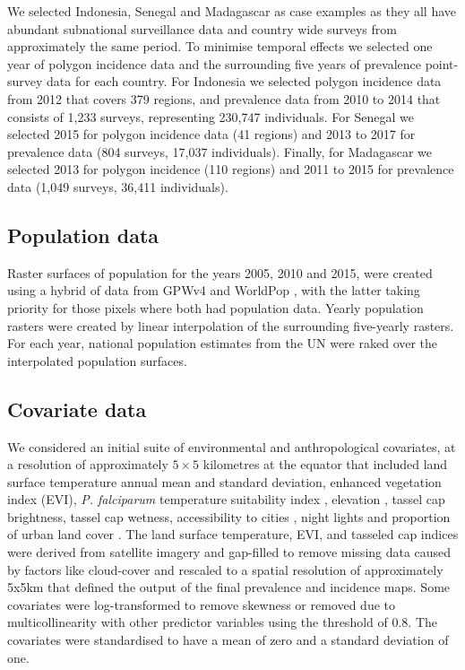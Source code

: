 \documentclass{statsoc}
\begin{document}
We selected Indonesia, Senegal and Madagascar as case examples as they all have abundant subnational surveillance data and country wide surveys from approximately the same period.
To minimise temporal effects we selected one year of polygon incidence data and the surrounding five years of prevalence point-survey data for each country.
For Indonesia we selected polygon incidence data from 2012 that covers 379 regions, and prevalence data from 2010 to 2014 that consists of 1,233 surveys, representing 230,747 individuals.
For Senegal we selected 2015 for polygon incidence data (41 regions) and 2013 to 2017 for prevalence data (804 surveys, 17,037 individuals).
Finally, for Madagascar we selected 2013 for polygon incidence (110 regions) and 2011 to 2015 for prevalence data (1,049 surveys, 36,411 individuals).


\subsection*{Population data}

Raster surfaces of population for the years 2005, 2010 and 2015, were created using a hybrid of data from GPWv4 \citep{gpw4} and WorldPop \citep{tatem2017worldpop}, with the latter taking priority for those pixels where both had population data. 
Yearly population rasters were created by linear interpolation of the surrounding five-yearly rasters.
For each year, national population estimates from the UN were raked over the interpolated population surfaces. 


\subsection*{Covariate data}

We considered an initial suite of environmental and anthropological covariates, at a resolution of approximately $5 \times 5$ kilometres at the equator that included land surface temperature annual mean and standard deviation, enhanced vegetation index (EVI), \emph{P. falciparum} temperature suitability index \citep{weiss2014air}, elevation \citep{SRTMElev}, tassel cap brightness, tassel cap wetness, accessibility to cities \citep{weiss2018global}, night lights \citep{elvidge2017viirs} and proportion of urban land cover \citep{GUF}. %
The land surface temperature, EVI, and tasseled cap indices were derived from satellite imagery and gap-filled to remove missing data caused by factors like cloud-cover \citep{weiss2014effective} and rescaled to a spatial resolution of approximately 5x5km \citep{weiss2015re} that defined the output of the final prevalence and incidence maps.
Some covariates were log-transformed to remove skewness or removed due to multicollinearity with other predictor variables using the threshold of 0.8. %
The covariates were standardised to have a mean of zero and a standard deviation of one.
\end{document}
